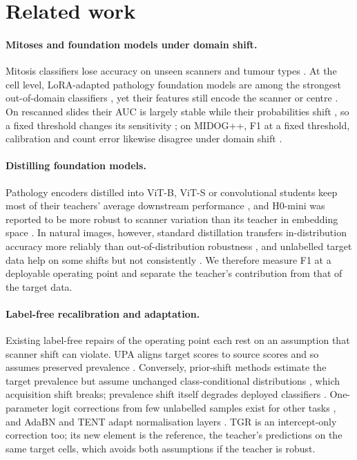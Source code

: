 \section{Related work}
\label{sec:related}

\paragraph{Mitoses and foundation models under domain shift.} Mitosis classifiers lose accuracy on unseen scanners and
tumour types \citep{aubreville2021quantifying,aubreville2023mitosis,aubreville2024domain}. At the cell level,
LoRA-adapted pathology foundation models are among the strongest out-of-domain classifiers
\citep{ammeling2026benchmarking}, yet their features still encode the scanner or centre
\citep{dejong2025current,komen2025towards}. On rescanned slides their AUC is largely stable while their probabilities
shift \citep{thiringer2026scanner}, so a fixed threshold changes its sensitivity \citep{wen2026tempering}; on MIDOG++,
F1 at a fixed threshold, calibration and count error likewise disagree under domain shift \citep{desouza2026metric}.

\paragraph{Distilling foundation models.} Pathology encoders distilled into ViT-B, ViT-S or convolutional students keep
most of their teachers' average downstream performance \citep{filiot2025distilling,cai2026deployment,lenz2026multi},
and H0-mini was reported to be more robust to scanner variation than its teacher in embedding space
\citep{filiot2025distilling}. In natural images, however, standard distillation transfers in-distribution accuracy more
reliably than out-of-distribution robustness \citep{zhou2023distilling,addepalli2024leveraging}, and
unlabelled target data help on some shifts but not consistently \citep{sagawa2022extending}. We therefore measure F1 at a
deployable operating point and separate the teacher's contribution from that of the target data.

\paragraph{Label-free recalibration and adaptation.} Existing label-free repairs of the operating point each rest on an
assumption that scanner shift can violate. UPA aligns target scores to source scores and so assumes preserved
prevalence \citep{roschewitz2023automatic}. Conversely, prior-shift methods estimate the target prevalence
\citep{saerens2002adjusting,lipton2018detecting,alexandari2020maximum} but assume unchanged class-conditional
distributions \citep{garg2020unified}, which acquisition shift breaks; prevalence shift itself degrades deployed
classifiers \citep{godau2023deployment}. One-parameter logit corrections from few unlabelled samples exist for other
tasks \citep{zhou2024batch,yang2026your}, and AdaBN and TENT adapt normalisation layers
\citep{li2018adaptive,schneider2020improving,wang2021tent}. TGR is an intercept-only correction too; its new element is
the reference, the teacher's predictions on the same target cells, which avoids both assumptions if the teacher is robust.
